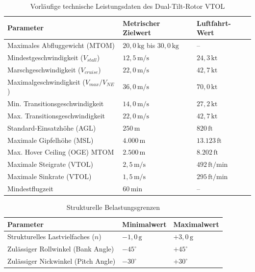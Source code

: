 \begin{table}[h!]
    \centering
    \caption{Vorläufige technische Leistungsdaten des Dual-Tilt-Rotor VTOL}
    \vspace{0.2cm}
    \begin{tabular}{p{6.5cm} p{4.5cm} p{3.5cm}}
        \toprule
        \textbf{Parameter} & \textbf{Metrischer Zielwert} & \textbf{Luftfahrt-Wert} \\
        \midrule
        Maximales Abfluggewicht (MTOM) & $20{,}0\,\text{kg}$ bis $30{,}0\,\text{kg}$ & -- \\
        Mindestgeschwindigkeit ($V_{stall}$) & $12{,}5\,\text{m/s}$ & $24{,}3\,\text{kt} $ \\
        Marschgeschwindigkeit ($V_{cruise}$) & $22{,}0\,\text{m/s}$ & $42{,}7\,\text{kt}$ \\
        Maximalgeschwindigkeit ($V_{max} / V_{NE}$) & $36{,}0\,\text{m/s}$ & $70{,}0\,\text{kt}$ \\
        Min. Transitionsgeschwindigkeit & $14{,}0\,\text{m/s}$ & $27{,}2\,\text{kt}$ \\
        Max. Transitionsgeschwindigkeit & $22{,}0\,\text{m/s}$ & $42{,}7\,\text{kt}$ \\
        Standard-Einsatzhöhe (AGL) & $250\,\text{m}$ & $820\,\text{ft}$ \\
        Maximale Gipfelhöhe (MSL) & $4.000\,\text{m}$ & $13.123\,\text{ft}$ \\
        Max. Hover Ceiling (OGE) MTOM & $2.500\,\text{m}$ & $8.202\,\text{ft}$ \\
        Maximale Steigrate (VTOL) & $2{,}5\,\text{m/s}$ & $492\,\text{ft/min}$ \\
        Maximale Sinkrate (VTOL) & $1{,}5\,\text{m/s}$ & $295\,\text{ft/min}$ \\
        Mindestflugzeit & $60\,\text{min}$ & -- \\
        \bottomrule
    \end{tabular}
    \label{tab:flight_envelope_specs}
\end{table}

\begin{table}[h!]
    \centering
    \caption{Strukturelle Belastungsgrenzen}
    \vspace{0.2cm}
    \begin{tabular}{p{6.5cm} p{4.5cm} p{3.5cm}}
        \toprule
        \textbf{Parameter} & \textbf{Minimalwert} & \textbf{Maximalwert} \\
        \midrule
        Strukturelles Lastvielfaches ($n$) & $-1{,}0\,\text{g}$ & $+3{,}0\,\text{g}$ \\
        Zulässiger Rollwinkel (Bank Angle) & $-45^\circ$ & $+45^\circ$ \\
        Zulässiger Nickwinkel (Pitch Angle) & $-30^\circ$ & $+30^\circ$ \\
        \bottomrule
    \end{tabular}
    \label{tab:structural_limits}
\end{table}


